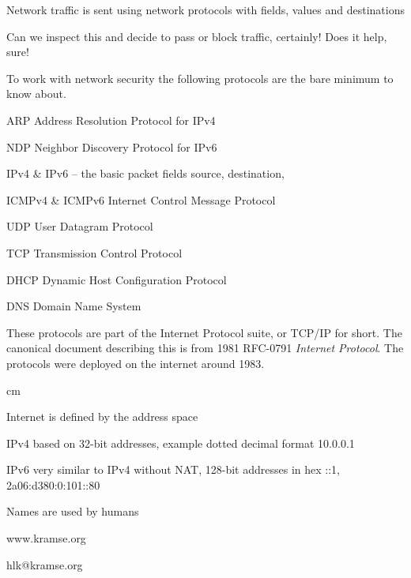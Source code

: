 \documentclass[Screen16to9,17pt]{foils}
\begin{document}
\begin{list2}
\item Network traffic is sent using network protocols with fields, values and destinations
\item Can we inspect this and decide to pass or block traffic, certainly! Does it help, sure!
\end{list2}




To work with network security the following protocols are the bare minimum to know about.

\begin{list2}
\item ARP Address Resolution Protocol for IPv4
\item NDP Neighbor Discovery Protocol for IPv6
\item IPv4 \& IPv6 -- the basic packet fields source, destination,
\item ICMPv4 \& ICMPv6 Internet Control Message Protocol
\item UDP User Datagram Protocol
\item TCP Transmission Control Protocol
\item DHCP Dynamic Host Configuration Protocol
\item DNS Domain Name System
\end{list2}

These protocols are part of the Internet Protocol suite, or TCP/IP for short. The canonical document describing this is from 1981 RFC-0791 \emph{Internet Protocol}. The protocols were deployed on the internet around 1983.



 cm

\begin{list2}
\item Internet is defined by the address space
\item IPv4 based on 32-bit addresses, example dotted decimal format 10.0.0.1
\item IPv6 very similar to IPv4 without NAT, 128-bit addresses in hex ::1, 2a06:d380:0:101::80
\end{list2}



Names are used by humans
\begin{center}\hlkbig
www.kramse.org

hlk@kramse.org
\end{center}
\end{document}
